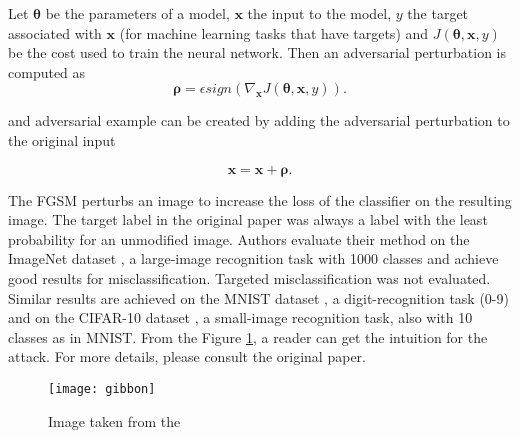 Let $\pmb \theta$ be the parameters of a model, $\pmb x$ the input to the model, $y$ the target associated with $\pmb x$ (for machine learning tasks that have targets) and $J (\pmb \theta, \pmb x, y)$ be the cost used to train the neural network. Then an adversarial perturbation is computed as 
\[ \pmb \rho = \epsilon sign (\nabla_{\pmb x} J(\pmb \theta, \pmb x, y)). \]

and adversarial example can be created by adding the adversarial perturbation to the original input

\[\pmb x = \pmb x + \pmb \rho .\]
 
 
The FGSM perturbs an image to increase the loss of the classifier on the resulting image. The target label in the original paper \cite{fgsm-original} was always a label with the least probability for an unmodified image. Authors evaluate their method on the ImageNet dataset \cite{datasetImageNet}, a large-image recognition task with 1000 classes and achieve good results for misclassification. Targeted misclassification was not evaluated. Similar results are achieved on the MNIST dataset 	\cite{datasetMNIST}, a digit-recognition task (0-9) and on the CIFAR-10 dataset \cite{datasetCIFAR10}, a small-image recognition task, also with 10 classes as in MNIST. From the Figure \ref{fig:gibbon}, a reader can get the intuition for the attack. For more details, please consult the original paper.

\begin{figure}[h]
\texttt{[image: gibbon]}
\caption{Image taken from the \cite{fgsm-original}}
\label{fig:gibbon}
\end{figure}


